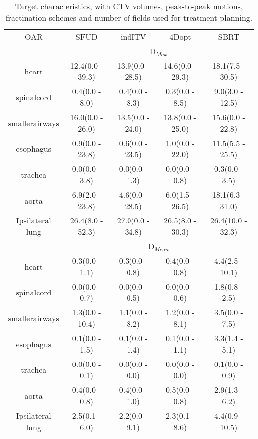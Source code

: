 \begin{table}[H]
	\centering
	\caption{Target characteristics, with CTV volumes, peak-to-peak motions, fractination schemes and number of fields used for treatment planning.}
	\begin{tabular}{c|c|c|c|c}
		\hline\hline
		 
		OAR & SFUD & indITV & 4Dopt & SBRT \\
		& \multicolumn{4}{c}{D$_{Max}$} \\
		\hline

heart & 12.4(0.0 - 39.3) & 13.9(0.0 - 28.5) & 14.6(0.0 - 29.3) & 18.1(7.5 - 30.5)\\ 
spinalcord & 0.4(0.0 - 8.0) & 0.4(0.0 - 8.3) & 0.3(0.0 - 8.5) & 9.0(3.0 - 12.5)\\ 
smallerairways & 16.0(0.0 - 26.0) & 13.5(0.0 - 24.0) & 13.8(0.0 - 25.0) & 15.6(0.0 - 22.8)\\ 
esophagus & 0.9(0.0 - 23.8) & 0.6(0.0 - 23.5) & 1.0(0.0 - 22.0) & 11.5(5.5 - 25.5)\\ 
trachea & 0.0(0.0 - 3.8) & 0.0(0.0 - 1.3) & 0.0(0.0 - 0.8) & 0.3(0.0 - 3.5)\\ 
aorta & 6.9(2.0 - 23.8) & 4.6(0.0 - 28.5) & 6.0(1.5 - 26.5) & 18.1(6.3 - 31.0)\\ 
Ipsilateral lung & 26.4(8.0 - 52.3) & 27.0(0.0 - 34.8) & 26.5(8.0 - 30.3) & 26.4(10.0 - 32.3)\\
\hline\hline
& \multicolumn{4}{c}{D$_{Mean}$} \\

heart & 0.3(0.0 - 1.1) & 0.3(0.0 - 0.8) & 0.4(0.0 - 0.8) & 4.4(2.5 - 10.1)\\ 
spinalcord & 0.0(0.0 - 0.7) & 0.0(0.0 - 0.5) & 0.0(0.0 - 0.6) & 1.8(0.8 - 2.5)\\ 
smallerairways & 1.3(0.0 - 10.4) & 1.1(0.0 - 8.2) & 1.2(0.0 - 8.1) & 3.5(0.0 - 7.5)\\ 
esophagus & 0.1(0.0 - 1.5) & 0.1(0.0 - 1.4) & 0.1(0.0 - 1.1) & 3.3(1.4 - 5.1)\\ 
trachea & 0.0(0.0 - 0.1) & 0.0(0.0 - 0.0) & 0.0(0.0 - 0.0) & 0.1(0.0 - 0.9)\\ 
aorta & 0.4(0.0 - 0.8) & 0.4(0.0 - 1.0) & 0.5(0.0 - 0.8) & 2.9(1.3 - 6.2)\\ 
Ipsilateral lung & 2.5(0.1 - 6.0) & 2.2(0.0 - 9.1) & 2.3(0.1 - 8.6) & 4.4(0.9 - 10.5)\\

\hline\hline

	\end{tabular}
	\label{tab:OARComplex}
\end{table}